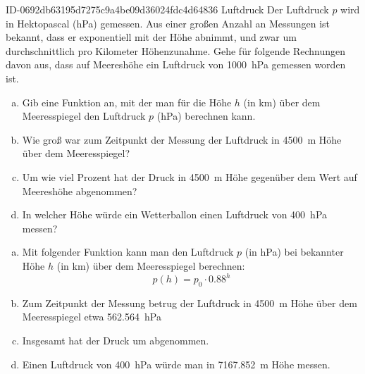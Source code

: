 \begin{exercise}
      {ID-0692db63195d7275c9a4be09d36024fdc4d64836}
      {Luftdruck}
  \ifproblem\problem
    Der Luftdruck $p$ wird in Hektopascal (\si{\hecto\pascal})
    gemessen. Aus einer großen Anzahl an Messungen ist bekannt,
    dass er exponentiell mit der Höhe abnimmt, und zwar um
    durchschnittlich  pro Kilometer Höhenzunahme. Gehe
    für folgende Rechnungen davon aus, dass auf Meereshöhe ein
    Luftdruck von \SI{1000}{\hecto\pascal} gemessen worden ist.
    \begin{enumerate}[a)]
      \item Gib eine Funktion an, mit der man für die Höhe $h$
            (in \si{\kilo\metre}) über dem Meeresspiegel den
            Luftdruck $p$ (\si{\hecto\pascal}) berechnen kann.
      \item Wie groß war zum Zeitpunkt der Messung der Luftdruck
            in \SI{4500}{\metre} Höhe über dem Meeresspiegel?
      \item Um wie viel Prozent hat der Druck in \SI{4500}{\metre}
            Höhe gegenüber dem Wert auf Meereshöhe abgenommen?
      \item In welcher Höhe würde ein Wetterballon einen Luftdruck
            von \SI{400}{\hecto\pascal} messen?
    \end{enumerate}
  \fi
  \ifoutcome\outcome
    \begin{enumerate}[a)]
      \item Mit folgender Funktion kann man den Luftdruck $p$
            (in \si{\hecto\pascal}) bei bekannter Höhe $h$
            (in \si{\kilo\metre}) über dem Meeresspiegel
            berechnen:
            \begin{equation*}
              p(h)=p_{0}\cdot\num{0.88}^{h}
            \end{equation*}
      \item Zum Zeitpunkt der Messung betrug der Luftdruck in
            \SI{4500}{\metre} Höhe über dem Meeresspiegel etwa
            \SI{562.564}{\hecto\pascal}
      \item Insgesamt hat der Druck um  abgenommen.
      \item Einen Luftdruck von \SI{400}{\hecto\pascal} würde man
            in \SI{7167.852}{\metre} Höhe messen.
    \end{enumerate}
  \fi
\end{exercise}
